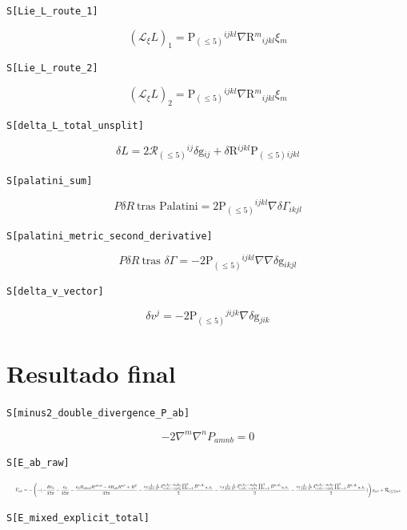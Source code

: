\documentclass[11pt,a4paper]{article}
\begin{document}
\noindent\texttt{S[Lie\_L\_route\_1]}

\[
\boxed{(\mathcal L_\xi L)_1 = \mathrm{P}_{(\leq 5)}{}^{ijkl}\nabla \mathrm{R}{}^{m}{}_{ijkl}\xi{}_{m}}
\]


\noindent\texttt{S[Lie\_L\_route\_2]}

\[
\boxed{(\mathcal L_\xi L)_2 = \mathrm{P}_{(\leq 5)}{}^{ijkl}\nabla \mathrm{R}{}^{m}{}_{ijkl}\xi{}_{m}}
\]


\noindent\texttt{S[delta\_L\_total\_unsplit]}

\[
\boxed{\delta L = 2\mathcal{R}_{(\leq 5)}{}^{ij}\delta \mathrm{g}{}_{ij} + \delta \mathrm{R}{}^{ijkl}\mathrm{P}_{(\leq 5)}{}_{ijkl}}
\]


\noindent\texttt{S[palatini\_sum]}

\[
\boxed{P\delta R\ \text{tras Palatini} = 2\mathrm{P}_{(\leq 5)}{}^{ijkl}\nabla\delta\Gamma{}_{ikjl}}
\]


\noindent\texttt{S[palatini\_metric\_second\_derivative]}

\[
\boxed{P\delta R\ \text{tras }\delta\Gamma = -2\mathrm{P}_{(\leq 5)}{}^{ijkl}\nabla\nabla\delta \mathrm{g}{}_{ikjl}}
\]


\noindent\texttt{S[delta\_v\_vector]}

\[
\boxed{\delta v^j = -2\mathrm{P}_{(\leq 5)}{}^{jijk}\nabla\delta \mathrm{g}{}_{jik}}
\]


\section*{Resultado final}

\noindent\texttt{S[minus2\_double\_divergence\_P\_ab]}

\[
\boxed{-2\nabla^m\nabla^nP_{amnb} = 0}
\]


\noindent\texttt{S[E\_ab\_raw]}

\[
\resizebox{\textwidth}{!}{$\displaystyle E_{ab} = -\left(- (- \frac{R c_{1}}{32 \pi} - \frac{c_{0}}{32 \pi} - \frac{c_{2} R_{abcd}R^{abcd}-4R_{ab}R^{ab}+R^2}{32 \pi} - \frac{c_{3} \frac{1}{16\pi}\frac{1}{2^{3}}\,\delta^{a_1b_1\cdots a_3b_3}_{c_1d_1\cdots c_3d_3}\prod_{r=1}^{3}R^{c_rd_r}{}_{a_rb_r}}{2} - \frac{c_{4} \frac{1}{16\pi}\frac{1}{2^{4}}\,\delta^{a_1b_1\cdots a_4b_4}_{c_1d_1\cdots c_4d_4}\prod_{r=1}^{4}R^{c_rd_r}{}_{a_rb_r}}{2} - \frac{c_{5} \frac{1}{16\pi}\frac{1}{2^{5}}\,\delta^{a_1b_1\cdots a_5b_5}_{c_1d_1\cdots c_5d_5}\prod_{r=1}^{5}R^{c_rd_r}{}_{a_rb_r}}{2})\right)\mathrm{g}{}_{ab} + \mathcal{R}_{(\leq 5)}{}_{ab}$}
\]


\noindent\texttt{S[E\_mixed\_explicit\_total]}
\end{document}
